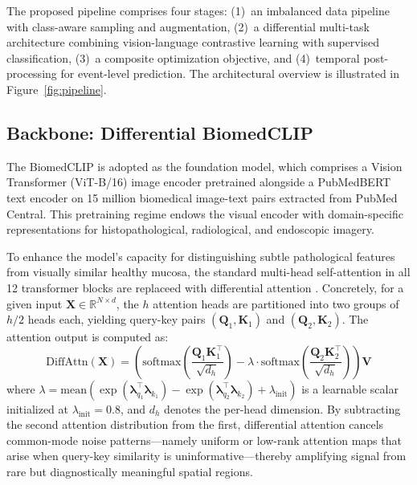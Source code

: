 \documentclass[12pt]{article}
\begin{document}
The proposed pipeline comprises four stages: (1)~an imbalanced data pipeline with class-aware sampling and augmentation, (2)~a differential multi-task architecture combining vision-language contrastive learning with supervised classification, (3)~a composite optimization objective, and (4)~temporal post-processing for event-level prediction. The architectural overview is illustrated in Figure~\ref{fig:pipeline}.

\subsection{Backbone: Differential BiomedCLIP}

The BiomedCLIP \cite{Zhang2023biomedclip} is adopted as the foundation model, which comprises a Vision Transformer (ViT-B/16) image encoder pretrained alongside a PubMedBERT \cite{Gu2022pubmedbert} text encoder on 15 million biomedical image-text pairs extracted from PubMed Central. This pretraining regime endows the visual encoder with domain-specific representations for histopathological, radiological, and endoscopic imagery.

To enhance the model's capacity for distinguishing subtle pathological features from visually similar healthy mucosa, the standard multi-head self-attention in all 12 transformer blocks are replaceed with differential attention \cite{Ye2024difftransformer}. Concretely, for a given input $\mathbf{X} \in \mathbb{R}^{N \times d}$, the $h$ attention heads are partitioned into two groups of $h/2$ heads each, yielding query-key pairs $(\mathbf{Q}_1, \mathbf{K}_1)$ and $(\mathbf{Q}_2, \mathbf{K}_2)$. The attention output is computed as:
\begin{equation}
    \text{DiffAttn}(\mathbf{X}) = \left(\text{softmax}\left(\frac{\mathbf{Q}_1\mathbf{K}_1^\top}{\sqrt{d_h}}\right) - \lambda \cdot \text{softmax}\left(\frac{\mathbf{Q}_2\mathbf{K}_2^\top}{\sqrt{d_h}}\right)\right)\mathbf{V}
\end{equation}
where $\lambda = \text{mean}(\exp(\boldsymbol{\lambda}_{q_1}^\top \boldsymbol{\lambda}_{k_1}) - \exp(\boldsymbol{\lambda}_{q_2}^\top \boldsymbol{\lambda}_{k_2}) + \lambda_{\text{init}})$ is a learnable scalar initialized at $\lambda_{\text{init}} = 0.8$, and $d_h$ denotes the per-head dimension. By subtracting the second attention distribution from the first, differential attention cancels common-mode noise patterns—namely uniform or low-rank attention maps that arise when query-key similarity is uninformative—thereby amplifying signal from rare but diagnostically meaningful spatial regions.
\end{document}
